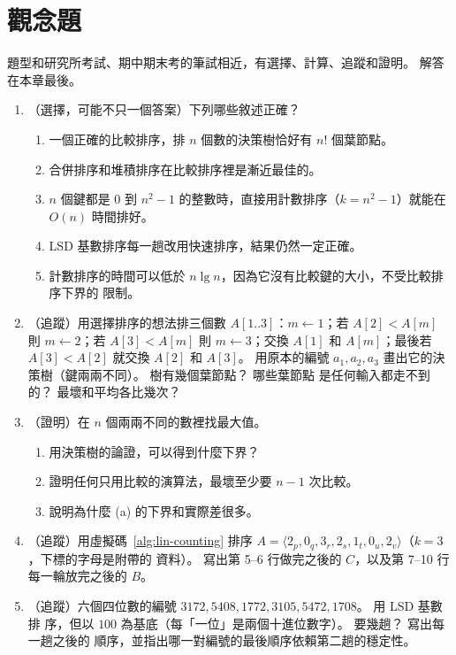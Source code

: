 \section{觀念題}
\label{sec:lin-exercises}

題型和研究所考試、期中期末考的筆試相近，有選擇、計算、追蹤和證明。 解答在本章最後。

\begin{enumerate}
\item （選擇，可能不只一個答案）下列哪些敘述正確？
\begin{enumerate}
\item 一個正確的比較排序，排 $n$ 個數的決策樹恰好有 $n!$ 個葉節點。
\item 合併排序和堆積排序在比較排序裡是漸近最佳的。
\item $n$ 個鍵都是 $0$ 到 $n^2 - 1$ 的整數時，直接用計數排序（$k = n^2 - 1$）就能在
$O(n)$ 時間排好。
\item LSD 基數排序每一趟改用快速排序，結果仍然一定正確。
\item 計數排序的時間可以低於 $n \lg n$，因為它沒有比較鍵的大小，不受比較排序下界的
限制。
\end{enumerate}

\item （追蹤）用選擇排序的想法排三個數 $A[1..3]$：$m \gets 1$；若 $A[2] < A[m]$ 則
$m \gets 2$；若 $A[3] < A[m]$ 則 $m \gets 3$；交換 $A[1]$ 和 $A[m]$；最後若
$A[3] < A[2]$ 就交換 $A[2]$ 和 $A[3]$。 用原本的編號 $a_1, a_2, a_3$ 畫出它的決策樹（鍵兩兩不同）。 樹有幾個葉節點？ 哪些葉節點
是任何輸入都走不到的？ 最壞和平均各比幾次？

\item （證明）在 $n$ 個兩兩不同的數裡找最大值。
\begin{enumerate}
\item 用決策樹的論證，可以得到什麼下界？
\item 證明任何只用比較的演算法，最壞至少要 $n - 1$ 次比較。
\item 說明為什麼 (a) 的下界和實際差很多。
\end{enumerate}

\item （追蹤）用虛擬碼~\ref{alg:lin-counting} 排序
$A = \langle 2_p, 0_q, 3_r, 2_s, 1_t, 0_u, 2_v \rangle$（$k = 3$，下標的字母是附帶的
資料）。 寫出第 5--6 行做完之後的 $C$，以及第 7--10 行每一輪放完之後的 $B$。

\item （追蹤）六個四位數的編號 $3172, 5408, 1772, 3105, 5472, 1708$。 用 LSD 基數排
序，但以 $100$ 為基底（每「一位」是兩個十進位數字）。 要幾趟？ 寫出每一趟之後的
順序，並指出哪一對編號的最後順序依賴第二趟的穩定性。


\end{enumerate}
